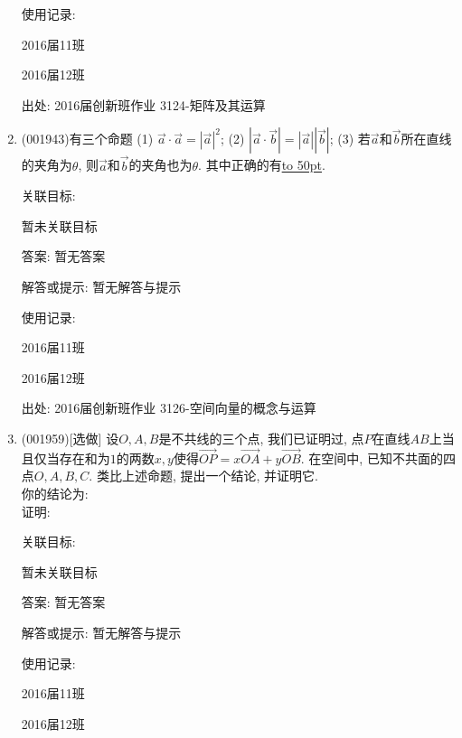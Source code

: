 \documentclass[10pt,a4paper]{article}
\newcommand{\blank}[1]{\underline{\hbox to #1pt{}}}
\begin{document}
\begin{enumerate}[1.]
使用记录:

2016届11班						

2016届12班						


出处: 2016届创新班作业	3124-矩阵及其运算
\item { (001943)}有三个命题 (1) $\overrightarrow{a}\cdot \overrightarrow{a}=|\overrightarrow{a}|^2$;
(2) $|\overrightarrow{a}\cdot\overrightarrow{b}|=|\overrightarrow{a}||\overrightarrow{b}|$; (3) 若$\overrightarrow{a}$和$\overrightarrow{b}$所在直线的夹角为$\theta$, 则$\overrightarrow{a}$和$\overrightarrow{b}$的夹角也为$\theta$. 其中正确的有\blank{50}.


关联目标:

暂未关联目标

答案: 暂无答案

解答或提示: 暂无解答与提示

使用记录:

2016届11班	

2016届12班	


出处: 2016届创新班作业	3126-空间向量的概念与运算
\item { (001959)}[选做]
设$O,A,B$是不共线的三个点, 我们已证明过, 点$P$在直线$AB$上当且仅当存在和为$1$的两数$x,y$使得$\overrightarrow{OP}=x\overrightarrow{OA}+y\overrightarrow{OB}$. 在空间中, 已知不共面的四点$O,A,B,C$. 类比上述命题, 提出一个结论, 并证明它.\\ 
你的结论为:\\ 
证明:


关联目标:

暂未关联目标

答案: 暂无答案

解答或提示: 暂无解答与提示

使用记录:

2016届11班		

2016届12班		



\end{enumerate}
\end{document}
